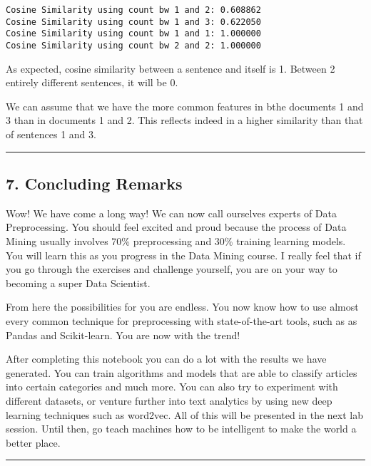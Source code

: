 \documentclass[11pt]{article}
\begin{document}
    \begin{Verbatim}[commandchars=\\\{\}]
Cosine Similarity using count bw 1 and 2: 0.608862
Cosine Similarity using count bw 1 and 3: 0.622050
Cosine Similarity using count bw 1 and 1: 1.000000
Cosine Similarity using count bw 2 and 2: 1.000000

    \end{Verbatim}

    As expected, cosine similarity between a sentence and itself is 1.
Between 2 entirely different sentences, it will be 0.

We can assume that we have the more common features in bthe documents 1
and 3 than in documents 1 and 2. This reflects indeed in a higher
similarity than that of sentences 1 and 3.

    \begin{center}\rule{0.5\linewidth}{\linethickness}\end{center}

    \hypertarget{concluding-remarks}{%
\subsection{7. Concluding Remarks}\label{concluding-remarks}}

    Wow! We have come a long way! We can now call ourselves experts of Data
Preprocessing. You should feel excited and proud because the process of
Data Mining usually involves 70\% preprocessing and 30\% training
learning models. You will learn this as you progress in the Data Mining
course. I really feel that if you go through the exercises and challenge
yourself, you are on your way to becoming a super Data Scientist.

From here the possibilities for you are endless. You now know how to use
almost every common technique for preprocessing with state-of-the-art
tools, such as as Pandas and Scikit-learn. You are now with the trend!

After completing this notebook you can do a lot with the results we have
generated. You can train algorithms and models that are able to classify
articles into certain categories and much more. You can also try to
experiment with different datasets, or venture further into text
analytics by using new deep learning techniques such as word2vec. All of
this will be presented in the next lab session. Until then, go teach
machines how to be intelligent to make the world a better place.

    \begin{center}\rule{0.5\linewidth}{\linethickness}\end{center}
\end{document}
